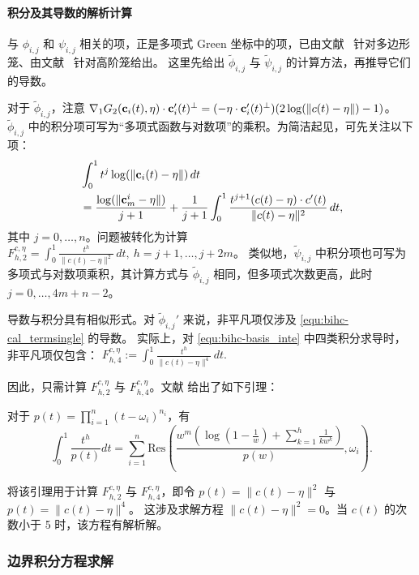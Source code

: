 \paragraph{积分及其导数的解析计算}
与 \(\phi_{i,j}\) 和 \(\psi_{i,j}\) 相关的项，正是多项式 Green 坐标中的项，已由文献~\cite{MichelThiery2023} 针对多边形笼、由文献~\cite{liu2024polygc} 针对高阶笼给出。
这里先给出 \(\tilde{\phi}_{i,j}\) 与 \(\tilde{\psi}_{i,j}\) 的计算方法，再推导它们的导数。

对于 \(\tilde{\phi}_{i,j}\)，注意
\(\nabla_1 G_2(\mathbf{c}_i(t),\eta) \cdot \mathbf{c}_i'(t)^{\perp} = (-\eta \cdot \mathbf{c}_i'(t)^{\perp})(2 \log(\| c(t) - \eta\|) - 1)\)。
\(\tilde{\phi}_{i,j}\) 中的积分项可写为“多项式函数与对数项”的乘积。为简洁起见，可先关注以下项：
\begin{equation}\label{equ:bihc-cal_termsingle}
\begin{aligned}
    &\int_0^1 t^j \log(\|\mathbf{c}_i(t) - \eta \|)\, dt \\
    &= \frac{\log(\|\mathbf{c}^i_{m} - \eta\|)}{j+1} + \frac{1}{j+1}\int_0^1 \frac{t^{j+1}(c(t)-\eta)\cdot c'(t)}{\|c(t)-\eta\|^2}\, dt,
\end{aligned}
\end{equation}
其中 \(j = 0, \dots, n\)。问题被转化为计算
$F_{h,2}^{c,\eta}=\int_0^1\frac{t^h}{\|c(t)-\eta \|^2}\,dt,\ h=j+1,\dots,j+2m$。
类似地，\(\tilde{\psi}_{i,j}\) 中积分项也可写为多项式与对数项乘积，其计算方式与 \(\tilde{\phi}_{i,j}\) 相同，但多项式次数更高，此时 \(j = 0, \dots, 4m + n - 2\)。

导数与积分具有相似形式。对 \(\tilde{\phi}_{i,j}'\) 来说，非平凡项仅涉及 \eqref{equ:bihc-cal_termsingle} 的导数。
实际上，对 \eqref{equ:bihc-basis_inte} 中四类积分求导时，非平凡项仅包含：
$
F_{h,4}^{c,\eta} := \int_0^1 \frac{t^h}{\|c(t) - \eta \|^4} \, dt.
$

因此，只需计算 \(F_{h,2}^{c,\eta}\) 与 \(F_{h,4}^{c,\eta}\)。文献\cite{liu2024polygc} 给出了如下引理：
\begin{lemma}
对于 \(p(t) = \prod_{i=1}^{n} (t - \omega_i)^{n_i}\)，有
\[
\int_0^1 \frac{t^h}{p(t)} dt = \sum_{i=1}^{n} \text{Res}\left(\frac{w^m \left( \log\left(1 - \frac{1}{w}\right) + \sum_{k=1}^h \frac{1}{k w^k} \right)}{p(w)}, \omega_i\right).
\]
\end{lemma}
将该引理用于计算 \(F_{h,2}^{c,\eta}\) 与 \(F_{h,4}^{c,\eta}\)，即令
$p(t)=\|c(t) - \eta \|^2$ 与 $p(t)=\|c(t) - \eta \|^4$。
这涉及求解方程 \(\|c(t)-\eta\|^2=0\)。当 \(c(t)\) 的次数小于 5 时，该方程有解析解。

\subsubsection{边界积分方程求解}
